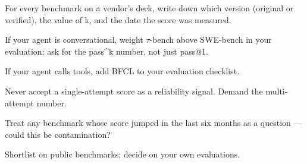 \begin{TNchecklist}
\item For every benchmark on a vendor's deck, write down which version (original or verified), the value of k, and the date the score was measured.
\item If your agent is conversational, weight $\tau$-bench above SWE-bench in your evaluation; ask for the pass\textasciicircum k number, not just pass@1.
\item If your agent calls tools, add BFCL to your evaluation checklist.
\item Never accept a single-attempt score as a reliability signal. Demand the multi-attempt number.
\item Treat any benchmark whose score jumped in the last six months as a question --- could this be contamination?
\item Shortlist on public benchmarks; decide on your own evaluations.
\end{TNchecklist}



